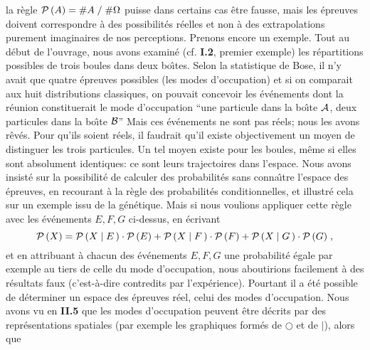 la r\`egle ${\cal P}\, (A) =  \#A\; / \;\#\Omega$ puisse dans certains 
cas \^etre fausse, mais les \'epreuves doivent correspondre \`a des 
possibilit\'es r\'eelles et non \`a des extrapolations purement  
imaginaires de nos perceptions.    
\medskip  
Prenons encore un exemple. Tout au d\'ebut de l'ouvrage, nous 
avons exa\-min\'e (cf. {\bf I.2}, premier exemple) les r\'epartitions 
possibles de trois boules dans deux bo\^\i tes. Selon la statistique de 
Bose, il n'y avait que quatre \'epreuves possibles (les modes 
d'occupation) et si on comparait aux huit distributions classiques, on 
pouvait concevoir les \'ev\'enements 
\smallskip 
{} 
\smallskip 
{} 
\smallskip 
{} 
\smallskip\noindent 
dont la r\'eunion constituerait le mode d'occupation ``une particule dans  
la bo\^\i te ${\cal A}$, deux particules dans la bo\^\i te  ${\cal B}$'' 
Mais ces \'ev\'enements ne sont pas r\'eels; nous les avons r\^ev\'es.  
Pour  qu'ils soient r\'eels, il faudrait qu'il existe objectivement un  
moyen de  distinguer les trois particules. Un tel moyen existe pour les 
boules, m\^eme si elles sont absolument identiques: ce sont leurs 
trajectoires dans l'espace. Nous avons insist\'e sur la possibilit\'e de  
calculer des probabilit\'es sans conna\^\i tre l'espace des \'epreuves, en 
recourant  \`a la r\`egle des  probabilit\'es conditionnelles, et illustr\'e 
cela sur un exemple issu de la g\'en\'etique. Mais si nous voulions 
appliquer cette r\`egle avec les \'ev\'enements $E,F,G$ ci-dessus, en 
\'ecrivant  
$${\cal P}\, (X) = {\cal P}\, (X\mid E\, ) \cdot {\cal 
P}\, (E) +  {\cal P}\, (X\mid F\, ) \cdot {\cal P}\, (F) + {\cal P}\, (X\mid 
G\, )   \cdot {\cal P}\, (G)\; ,$$  
et en attribuant \`a chacun des \'ev\'enements $E,F,G$ une probabilit\'e 
\'egale par  exemple au tiers de celle du mode d'occupation, nous 
aboutirions facilement \`a des r\'esultats faux (c'est-\`a-dire  
contredits par l'exp\'erience). Pourtant il a \'et\'e possible de  
d\'eterminer un espace des \'epreuves r\'eel, celui des modes 
d'occupation. Nous avons vu en {\bf II.5} que les modes d'occupation 
peuvent \^etre  d\'ecrits par des repr\'esentations spatiales (par 
exemple les graphiques form\'es de $\bigcirc$ et de $\mid$), alors que 

